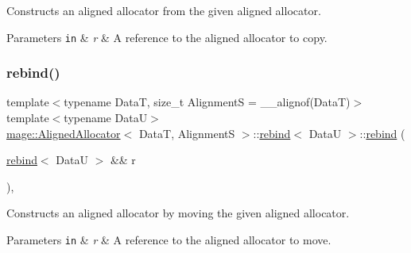 Constructs an aligned allocator from the given aligned allocator.


\begin{DoxyParams}[1]{Parameters}
\mbox{\tt in}  & {\em r} & A reference to the aligned allocator to copy. \\
\hline
\end{DoxyParams}
\hypertarget{structmage_1_1_aligned_allocator_1_1rebind_a0d0459ad0a109f7ba32cd9979d0c276d}{}\label{structmage_1_1_aligned_allocator_1_1rebind_a0d0459ad0a109f7ba32cd9979d0c276d} 
\subsubsection{\texorpdfstring{rebind()}{rebind()}\hspace{0.1cm}{\footnotesize\ttfamily [3/3]}}
{\footnotesize\ttfamily template$<$typename DataT, size\+\_\+t AlignmentS = \+\_\+\+\_\+alignof(\+Data\+T)$>$ \\
template$<$typename DataU$>$ \\
\hyperlink{structmage_1_1_aligned_allocator}{mage\+::\+Aligned\+Allocator}$<$ DataT, AlignmentS $>$\+::\hyperlink{structmage_1_1_aligned_allocator_1_1rebind}{rebind}$<$ DataU $>$\+::\hyperlink{structmage_1_1_aligned_allocator_1_1rebind}{rebind} (\begin{DoxyParamCaption}\item[{\hyperlink{structmage_1_1_aligned_allocator_1_1rebind}{rebind}$<$ DataU $>$ \&\&}]{r }\end{DoxyParamCaption})\hspace{0.3cm}{\ttfamily [private]}, {\ttfamily [delete]}}

Constructs an aligned allocator by moving the given aligned allocator.


\begin{DoxyParams}[1]{Parameters}
\mbox{\tt in}  & {\em r} & A reference to the aligned allocator to move. \\
\hline
\end{DoxyParams}
\hypertarget{structmage_1_1_aligned_allocator_1_1rebind_a6d49df31fc4f0a5122267be6ab8888a7}{}\label{structmage_1_1_aligned_allocator_1_1rebind_a6d49df31fc4f0a5122267be6ab8888a7} 
